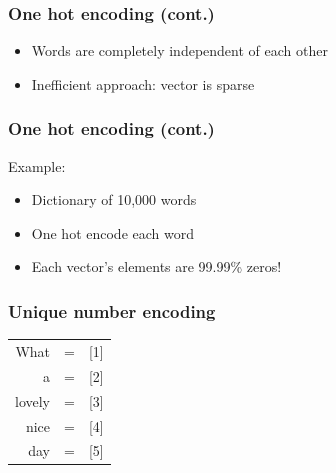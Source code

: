 

\begin{frame}
\frametitle{One hot encoding (cont.)}

	\begin{itemize}
		\item Words are completely independent of each other
		\item Inefficient approach: vector is sparse
	\end{itemize}

\end{frame}



\begin{frame}
\frametitle{One hot encoding (cont.)}

	Example:
	\begin{itemize}
		\item Dictionary of 10,000 words
		\item One hot encode each word
		\item Each vector's elements are 99.99\% zeros!
		
	\end{itemize}

\end{frame}



\begin{frame}
\frametitle{Unique number encoding}

\begin{table}[h]
	\hspace{15mm}
	\huge
	\begin{tabular}{rcl}
		What & = & [1] \\
		a & = & [2]\\
		lovely & = & [3]\\
		nice & = & [4]\\
		day & = & [5]\\
	\end{tabular}
\end{table}


\end{frame}


